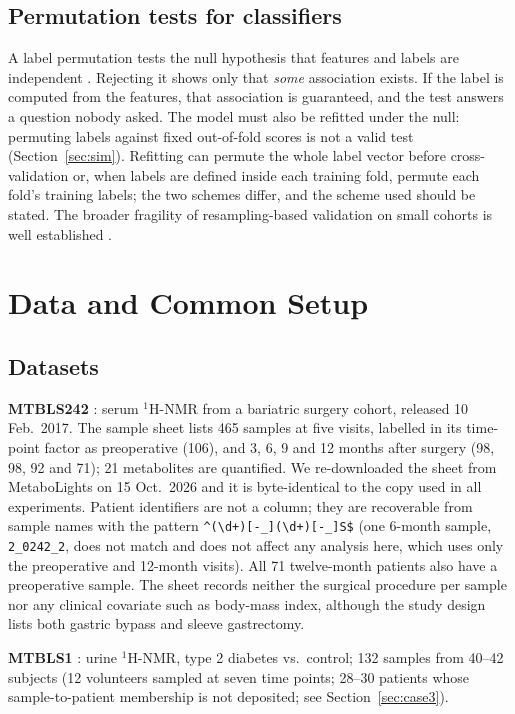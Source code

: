 \documentclass[conference]{IEEEtran}
\begin{document}
\subsection{Permutation tests for classifiers}
A label permutation tests the null hypothesis that features and labels are
independent \cite{ojala2010}. Rejecting it shows only that \emph{some}
association exists. If the label is computed from the features, that
association is guaranteed, and the test answers a question nobody asked.
The model must also be refitted under the null: permuting labels against
fixed out-of-fold scores is not a valid test (Section~\ref{sec:sim}).
Refitting can permute the whole label vector before cross-validation
\cite{ojala2010} or, when labels are defined inside each training fold,
permute each fold's training labels; the two schemes differ, and the scheme
used should be stated. The broader fragility of resampling-based
validation on small cohorts is well established
\cite{westerhuis2008, broadhurst2006, varma2006, varoquaux2018}.

\section{Data and Common Setup}
\label{sec:data}

\subsection{Datasets}
\textbf{MTBLS242} \cite{mtbls242, gralka2015}: serum $^1$H-NMR from a
bariatric surgery cohort, released 10 Feb.\ 2017. The sample sheet lists 465
samples at five visits, labelled in its time-point factor as preoperative
(106), and 3, 6, 9 and 12 months after surgery (98, 98, 92 and 71);
21 metabolites are quantified. We re-downloaded the sheet from MetaboLights
on 15 Oct.\ 2026 and it is byte-identical to the copy used in all
experiments. Patient identifiers are not a column; they are recoverable from
sample names with the pattern \verb|^(\d+)[-_](\d+)[-_]S$| (one 6-month
sample, \verb|2_0242_2|, does not match and does not affect any analysis
here, which uses only the preoperative and 12-month visits). All 71
twelve-month patients also have a preoperative sample. The sheet records
neither the surgical procedure per sample nor any clinical covariate such as
body-mass index, although the study design lists both gastric bypass and
sleeve gastrectomy.

\textbf{MTBLS1} \cite{salek2007}: urine $^1$H-NMR, type 2 diabetes vs.\
control; 132 samples from 40--42 subjects (12 volunteers sampled at seven
time points; 28--30 patients whose sample-to-patient membership is not
deposited; see Section~\ref{sec:case3}).
\end{document}
